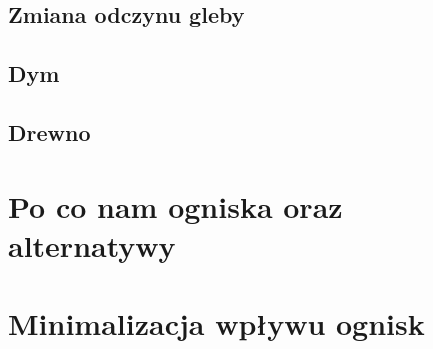 \subsection{Zmiana odczynu gleby}



\subsection{Dym}

\subsection{Drewno}

\section{Po co nam ogniska oraz alternatywy}

\section{Minimalizacja wpływu ognisk}

